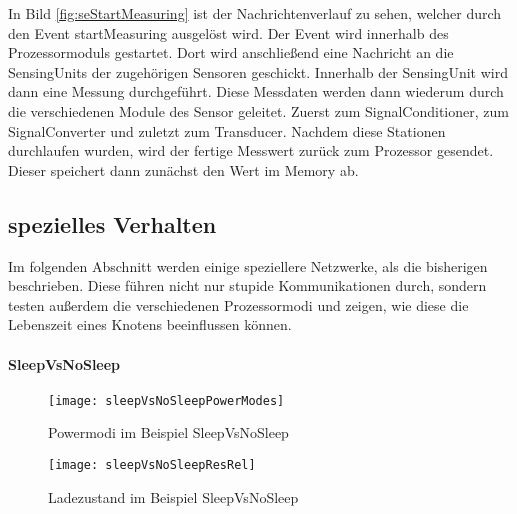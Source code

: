 In Bild \ref{fig:seStartMeasuring} ist der Nachrichtenverlauf zu sehen, welcher durch den Event startMeasuring ausgelöst wird. Der Event wird innerhalb des Prozessormoduls gestartet. Dort wird anschließend eine Nachricht an die SensingUnits der zugehörigen Sensoren geschickt. Innerhalb der SensingUnit wird dann eine Messung durchgeführt. Diese Messdaten werden dann wiederum durch die verschiedenen Module des Sensor geleitet. Zuerst zum SignalConditioner, zum SignalConverter und zuletzt zum Transducer. Nachdem diese Stationen durchlaufen wurden, wird der fertige Messwert zurück zum Prozessor gesendet. Dieser speichert dann zunächst den Wert im Memory ab.

\subsection*{spezielles Verhalten}

Im folgenden Abschnitt werden einige speziellere Netzwerke, als die bisherigen beschrieben. Diese führen nicht nur stupide Kommunikationen durch, sondern testen außerdem die verschiedenen Prozessormodi und zeigen, wie diese die Lebenszeit eines Knotens beeinflussen können.

\paragraph{SleepVsNoSleep}

\begin{figure}[htbp]
\centering
\caption{Powermodi im Beispiel SleepVsNoSleep}
\label{fig:sleepVsNoSleepPowerModes}
\texttt{[image: sleepVsNoSleepPowerModes]}
\end{figure}

\begin{figure}[htbp]
\centering
\caption{Ladezustand im Beispiel SleepVsNoSleep}
\label{fig:sleepVsNoSleepResRel}
\texttt{[image: sleepVsNoSleepResRel]}
\end{figure}

